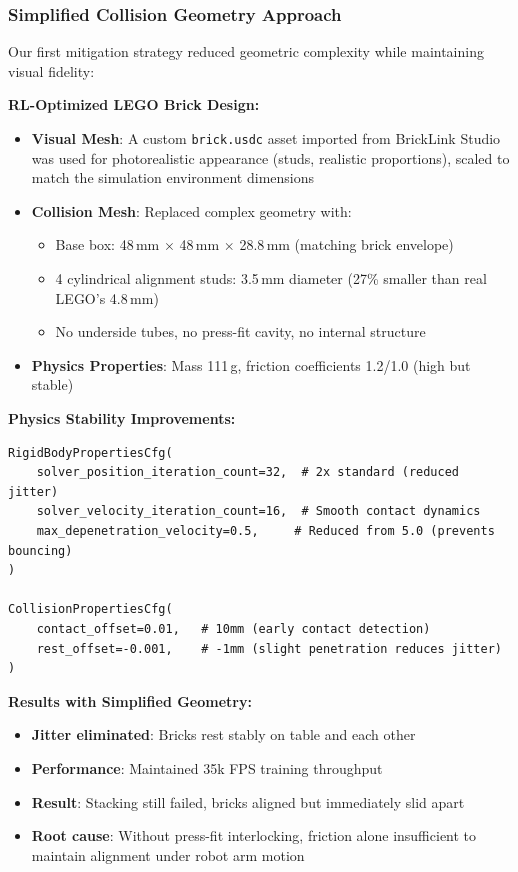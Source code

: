 \documentclass[12pt,a4paper,oneside]{report}
\begin{document}
\subsubsection{Simplified Collision Geometry Approach}

Our first mitigation strategy reduced geometric complexity while maintaining visual fidelity:

\textbf{RL-Optimized LEGO Brick Design:}
\begin{itemize}
    \item \textbf{Visual Mesh}: A custom \texttt{brick.usdc} asset imported from BrickLink Studio was used for photorealistic appearance (studs, realistic proportions), scaled to match the simulation environment dimensions
    \item \textbf{Collision Mesh}: Replaced complex geometry with:
    \begin{itemize}
        \item Base box: 48\,mm $\times$ 48\,mm $\times$ 28.8\,mm (matching brick envelope)
        \item 4 cylindrical alignment studs: 3.5\,mm diameter (27\% smaller than real LEGO's 4.8\,mm)
        \item No underside tubes, no press-fit cavity, no internal structure
    \end{itemize}
    \item \textbf{Physics Properties}: Mass 111\,g, friction coefficients 1.2/1.0 (high but stable)
\end{itemize}

\textbf{Physics Stability Improvements:}
\begin{lstlisting}
RigidBodyPropertiesCfg(
    solver_position_iteration_count=32,  # 2x standard (reduced jitter)
    solver_velocity_iteration_count=16,  # Smooth contact dynamics
    max_depenetration_velocity=0.5,     # Reduced from 5.0 (prevents bouncing)
)

CollisionPropertiesCfg(
    contact_offset=0.01,   # 10mm (early contact detection)
    rest_offset=-0.001,    # -1mm (slight penetration reduces jitter)
)
\end{lstlisting}

\textbf{Results with Simplified Geometry:}
\begin{itemize}
    \item \textbf{Jitter eliminated}: Bricks rest stably on table and each other
    \item \textbf{Performance}: Maintained 35k FPS training throughput
    \item \textbf{Result}: Stacking still failed, bricks aligned but immediately slid apart
    \item \textbf{Root cause}: Without press-fit interlocking, friction alone insufficient to maintain alignment under robot arm motion
\end{itemize}
\end{document}
